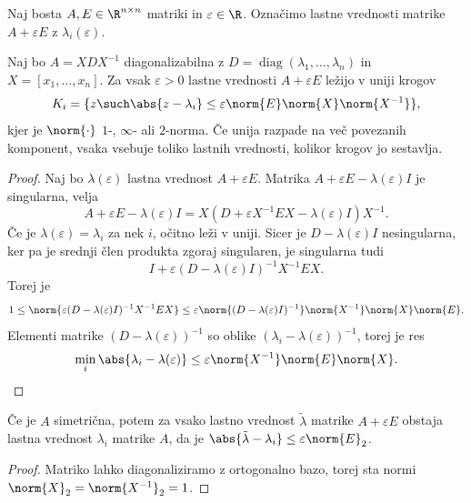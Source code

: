 
Naj bosta $A, E \in \R^{n \times n}$ matriki in $\varepsilon \in \R$.
Označimo lastne vrednosti matrike $A + \varepsilon E$ z
$\lambda_i(\varepsilon)$.

\begin{izrek}
  Naj bo $A = X D X^{-1}$ diagonalizabilna z $D = \operatorname{diag}(\lambda_1,
  \ldots, \lambda_n)$ in $X = [x_1, \ldots, x_n]$.
  Za vsak $\varepsilon > 0$ lastne vrednosti $A + \varepsilon E$ ležijo v uniji
  krogov
  \[
	K_i = \{ z \such \abs{z - \lambda_i} \le \varepsilon \norm{E} \norm{X}
	\norm{X^{-1}} \},
  \]
  kjer je $\norm{\cdot}$ $1$-, $\infty$- ali $2$-norma.
  Če unija razpade na več povezanih komponent, vsaka vsebuje toliko lastnih
  vrednosti, kolikor krogov jo sestavlja.
\end{izrek}

\begin{proof}
  Naj bo $\lambda(\varepsilon)$ lastna vrednost $A + \varepsilon E$.
  Matrika $A + \varepsilon E - \lambda(\varepsilon) I$ je singularna, velja
  \[
	A + \varepsilon E - \lambda(\varepsilon) I
	= X(D + \varepsilon X^{-1} E X - \lambda(\varepsilon) I) X^{-1}.
  \]
  Če je $\lambda(\varepsilon) = \lambda_i$ za nek $i$, očitno leži v uniji.
  Sicer je $D - \lambda(\varepsilon) I$ nesingularna, ker pa je srednji člen
  produkta zgoraj singularen, je singularna tudi
  \[
	I + \varepsilon (D - \lambda(\varepsilon) I)^{-1} X^{-1} E X.
  \]
  Torej je
  \[
	1 \le \norm{\varepsilon (D - \lambda(\varepsilon) I)^{-1} X^{-1} E X}
	\le \varepsilon \norm{(D - \lambda(\varepsilon) I)^{-1}} \norm{X^{-1}}
	\norm{X} \norm{E}.
  \]
  Elementi matrike $(D - \lambda(\varepsilon))^{-1}$ so oblike $(\lambda_i -
  \lambda(\varepsilon))^{-1}$, torej je res
  \[
	\min_i \abs{\lambda_i - \lambda(\varepsilon)} \le \varepsilon \norm{X^{-1}}
	\norm{E} \norm{X}.
  \]
\end{proof}


\begin{posledica}
  Če je $A$ simetrična, potem za vsako lastno vrednost $\tilde{\lambda}$ matrike
  $A + \varepsilon E$ obstaja lastna vrednost $\lambda_i$ matrike $A$, da je
  $\abs{\tilde{\lambda} - \lambda_i} \le \varepsilon \norm{E}_2$.
\end{posledica}

\begin{proof}
  Matriko lahko diagonaliziramo z ortogonalno bazo, torej sta normi $\norm{X}_2
  = \norm{X^{-1}}_2 = 1$.
\end{proof}

